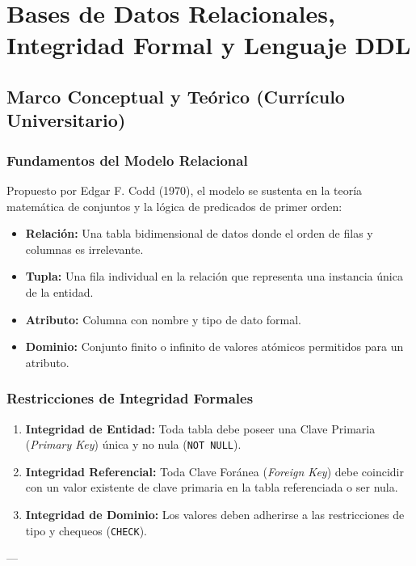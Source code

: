 \chapter{Bases de Datos Relacionales, Integridad Formal y Lenguaje DDL}
\label{cap:modelo_relacional_ddl}

\section{Marco Conceptual y Te\'orico (Curr\'iculo Universitario)}

\subsection{Fundamentos del Modelo Relacional}
Propuesto por Edgar F. Codd (1970), el modelo se sustenta en la teor\'ia matem\'atica de conjuntos y la l\'ogica de predicados de primer orden:
\begin{itemize}
    \item \textbf{Relaci\'on:} Una tabla bidimensional de datos donde el orden de filas y columnas es irrelevante.
    \item \textbf{Tupla:} Una fila individual en la relaci\'on que representa una instancia \'unica de la entidad.
    \item \textbf{Atributo:} Columna con nombre y tipo de dato formal.
    \item \textbf{Dominio:} Conjunto finito o infinito de valores at\'omicos permitidos para un atributo.
\end{itemize}

\subsection{Restricciones de Integridad Formales}
\begin{enumerate}
    \item \textbf{Integridad de Entidad:} Toda tabla debe poseer una Clave Primaria (\textit{Primary Key}) \'unica y no nula (\texttt{NOT NULL}).
    \item \textbf{Integridad Referencial:} Toda Clave For\'anea (\textit{Foreign Key}) debe coincidir con un valor existente de clave primaria en la tabla referenciada o ser nula.
    \item \textbf{Integridad de Dominio:} Los valores deben adherirse a las restricciones de tipo y chequeos (\texttt{CHECK}).
\end{enumerate}

---

